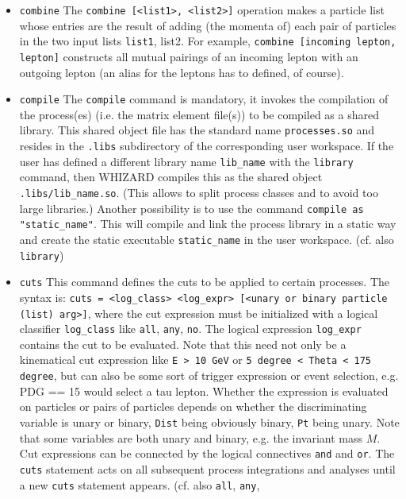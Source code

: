 \documentclass[12pt]{book}
\newcommand{\ttt}[1]{\texttt{#1}}
\begin{document}
\begin{itemize}
\item
\ttt{combine} \newline
The \ttt{combine [<list1>, <list2>]} operation makes a particle list
whose entries are the result of adding (the momenta of) each pair of
particles in the two input lists \ttt{list1}, {list2}. For example,
\ttt{combine [incoming lepton, lepton]} constructs all mutual pairings
of an incoming lepton with an outgoing lepton (an alias for the
leptons has to defined, of course).
\item
\ttt{compile} \newline 
The \ttt{compile} command is mandatory, it invokes the compilation of
the process(es) (i.e. the matrix element file(s)) to be compiled as a
shared library. This shared object file has the standard name
\ttt{processes.so} and resides in the \ttt{.libs} subdirectory of the
corresponding user workspace. If the user has defined a different
library name \ttt{lib\_name} with the \ttt{library} command, then
WHIZARD compiles this as the shared object
\ttt{.libs/lib\_name.so}. (This allows to split process classes and to
avoid too large libraries.) 
Another possibility is to use the command \ttt{compile as
  "static\_name"}. This will compile and link the process library in a
static way and create the static executable \ttt{static\_name} in the
user workspace. (cf. also \ttt{library})
\item
\ttt{cuts} \newline
This command defines the cuts to be applied to certain processes. The
syntax is: \ttt{cuts = <log\_class> <log\_expr> [<unary or binary
  particle (list) arg>]}, where the cut expression must be initialized
with a logical classifier \ttt{log\_class} like \ttt{all}, \ttt{any},
\ttt{no}. The logical expression \ttt{log\_expr} contains the cut to
be evaluated. Note that this need not only be a kinematical cut
expression like \ttt{E > 10  GeV} or \ttt{5 degree < Theta < 175
  degree}, but can also be some sort of trigger expression or event
selection, e.g. PDG == 15 would select a tau lepton.  Whether the
expression is evaluated on particles or pairs of particles depends on
whether the discriminating variable is unary or binary, \ttt{Dist}
being obviously binary, \ttt{Pt} being unary. Note that some variables
are both unary and binary, e.g. the invariant mass $M$. Cut
expressions can be connected by the logical  connectives \ttt{and} and
\ttt{or}. The \ttt{cuts} statement acts on all subsequent process
integrations and analyses until a new \ttt{cuts} statement appears.
(cf. also \ttt{all}, \ttt{any},

\end{itemize}
\end{document}
